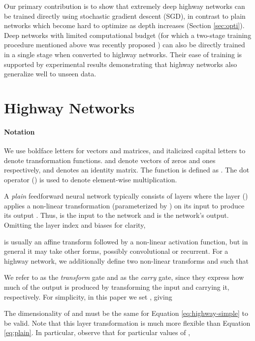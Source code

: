 \documentclass{article}
\begin{document}
Our primary contribution is to show that extremely deep highway networks can be trained directly using stochastic gradient descent (SGD), in contrast to plain networks which become hard to optimize as depth increases (Section \ref{sec:opti}). 
Deep networks with limited computational budget (for which a two-stage training procedure mentioned above was recently proposed \cite{Romero2014}) can also be directly trained in a single stage when converted to highway networks. Their ease of training is supported by experimental results demonstrating that highway networks also generalize well to unseen data.

\section{Highway Networks}

\paragraph{Notation}
We use boldface letters for vectors and matrices, and italicized capital letters to denote transformation functions.  and  denote vectors of zeros and ones respectively, and  denotes an identity matrix. The function  is defined as . The dot operator () is used to denote element-wise multiplication.

A \emph{plain} feedforward neural network typically consists of  layers where the  layer () applies a non-linear transformation  (parameterized by ) on its input  to produce its output . Thus,  is the input to the network and  is the network's output. Omitting the layer index and biases for clarity,



 is usually an affine transform followed by a non-linear activation function, but in general it may take other forms, possibly convolutional or recurrent. For a highway network, we additionally define two non-linear transforms  and  such that



We refer to  as the \emph{transform} gate and  as the \emph{carry} gate, since they express how much of the output is produced by transforming the input and carrying it, respectively. For simplicity, in this paper we set , giving



The dimensionality of  and  must be the same for Equation \ref{eq:highway-simple} to be valid.
Note that this layer transformation is much more flexible than Equation \ref{eq:plain}. 
In particular, observe that for particular values of ,
\end{document}
